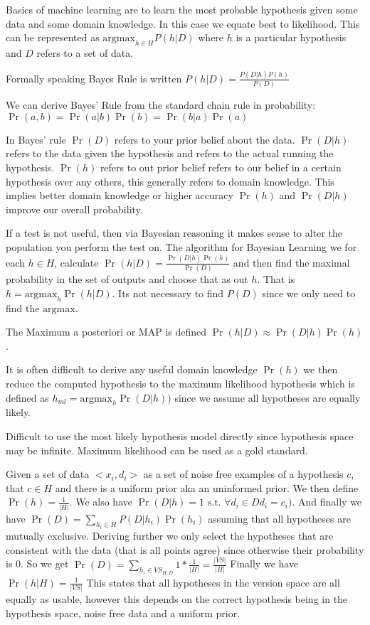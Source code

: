 \documentclass{article}
\begin{document}
Basics of machine learning are to learn the most probable hypothesis given some 
data and some domain knowledge. In this case we equate best to likelihood. This
can be represented as $\text{argmax}_{h \in H} P(h\vert D)$ where $h$ is a 
particular hypothesis and $D$ refers to a set of data. 

Formally speaking Bayes Rule is written $P(h\vert D) = \frac{P(D\vert h) P(h)}
{P(D)}$

We can derive Bayes' Rule from the standard chain rule in probability: 
$\Pr(a,b) = \Pr(a \vert b)\Pr(b) = \Pr(b \vert a)\Pr(a)$

In Bayes' rule $\Pr(D)$ refers to your prior belief about the data.
$\Pr(D \vert h)$ refers to the data given the hypothesis and refers to the
actual running the hypothesis. $\Pr(h)$ refers to out prior belief refers to our
belief in a certain hypothesis over any others, this generally refers to domain
knowledge. This implies better domain knowledge or higher accuracy $\Pr(h)$ and
$\Pr(D\vert h)$ improve our overall probability. 

If a test is not useful, then via Bayesian reasoning it makes sense to alter
the population you perform the test on. 
The algorithm for Bayesian Learning we for each $h \in H$, calculate $\Pr(h\vert D) = \frac{\Pr(D \vert h)\Pr(h)}{\Pr(D)}$ and then find the maximal
probability in the set of outputs and choose that as out $h$. That is $h = 
\text{argmax}_h \Pr(h \vert D)$.  Its not necessary to find $P(D)$ since we only
need to find the $\text{argmax}$. 

The Maximum a posteriori or MAP is defined $\Pr(h \vert D) \approx
\Pr(D \vert h) \Pr(h)$.

It is often difficult to derive any useful domain knowledge $\Pr(h)$ we then 
reduce the computed hypothesis to the maximum likelihood hypothesis which is 
defined as $h_{ml} = \text{argmax}_h \Pr(D \vert h))$ since we assume all 
hypotheses are equally likely.

Difficult to use the most likely hypothesis model directly since hypothesis
space may be infinite. Maximum likelihood can be used as a gold standard. 

Given a set of data ${<x_i, d_i>}$ as a set of noise free
examples of a hypothesis $c$, that $c \in H$ and there is a uniform prior
aka an uninformed prior. We then define $\Pr(h) = \frac{1}{\vert H \vert}$.
We also have $\Pr(D \vert h) = 1 \text{ s.t. } \forall d_i \in D d_i = c_i)$. And
finally we have $\Pr(D) = \sum_{h_i \in H} P(D \vert h_i)\Pr(h_i)$ assuming that
all hypotheses are mutually exclusive. Deriving further we only select the 
hypotheses that are consistent with the data (that is all points agree)
since otherwise their probability is 0. So we get $\Pr(D) = \sum_{h_i \in 
VS_{H,D}} 1 * \frac{1}{\vert H \vert} = \frac{\vert VS \vert}{\vert H \vert}$
Finally we have $\Pr(h\vert H) = \frac{1}{\vert VS \vert}$
This states that all hypotheses in the version space are all equally as usable,
however this depends on the correct hypothesis being in the hypothesis space,
noise free data and a uniform prior. 
\end{document}
